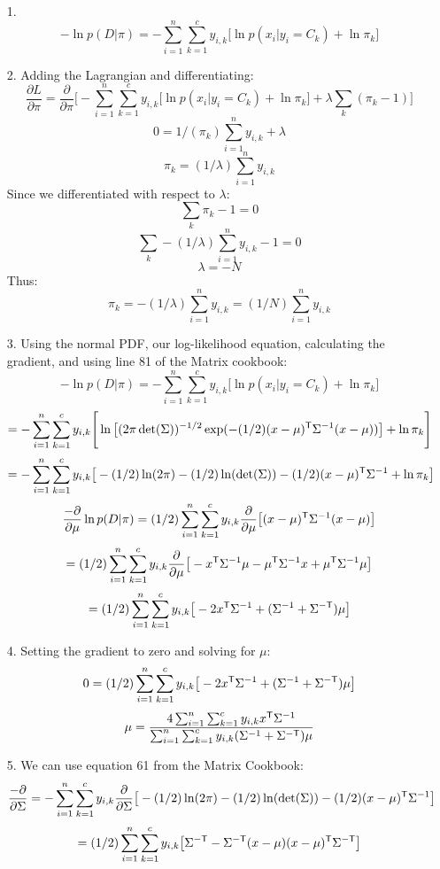 \documentclass[submit]{harvardml}
\begin{document}
\begin{enumerate}
\item[1.]
    $$-\ln p(D|\pi) = -\sum_{i=1}^n \sum_{k=1}^c y_{i,k}\big[\ln p(x_i|y_i=C_k) +
    \ln \pi_k \big]$$

\item[2.]
    Adding the Lagrangian and differentiating:
    $$\frac{\partial L}{\partial \pi} = \frac{\partial}{\partial
    \pi}\Bigg[-\sum_{i=1}^n \sum_{k=1}^c y_{i,k}\big[\ln p(x_i|y_i=C_k) + \ln
    \pi_k \big] + \lambda \sum_{k}(\pi_k - 1)\Bigg]$$
    $$0 = 1/(\pi_k)\sum_{i=1}^{n} y_{i,k} + \lambda$$
    $$\pi_k = (1/\lambda) \sum_{i=1}^{n} y_{i,k}$$
    Since we differentiated with respect to $\lambda$:
    $$\sum_k \pi_k - 1 = 0$$
    $$\sum_k - (1/\lambda) \sum_{i=1}^{n} y_{i,k} - 1 = 0$$
    $$\lambda = -N$$
    Thus:
    $$\pi_k = -(1/\lambda) \sum_{i=1}^{n} y_{i,k} = (1/N) \sum_{i=1}^{n}
    y_{i,k} $$

\item[3.]
    Using the normal PDF, our log-likelihood equation, calculating the
    gradient, and using line 81 of the Matrix cookbook:
    $$-\ln p(D|\pi) = -\sum_{i=1}^{n}\sum_{k=1}^{c}y_{i,k}\big[\ln p(x_i|y_i =
    C_k) + \ln \pi_k \big] $$
    $$= -\sum_{i=1}^{n}\sum_{k=1}^{c}y_{i,k}\Bigg[\ln \big[(2\pi
    \det(\Sigma))^{-1/2}\exp(-(1/2)(x-\mu)^{\mathsf{T}}\Sigma^{-1}(x-\mu)) \big] +
    \ln \pi_k \Bigg] $$
    $$= -\sum_{i=1}^{n}\sum_{k=1}^{c}y_{i,k}\big[-(1/2)\ln(2\pi) -
    (1/2)\ln(\det(\Sigma))-(1/2)(x-\mu)^{\mathsf{T}}\Sigma^{-1} + \ln \pi_k \big]
    $$
    $$\frac{-\partial}{\partial \mu} \ln p(D|\pi) = (1/2)\sum_{i=1}^{n}
    \sum_{k=1}^{c} y_{i,k}\frac{\partial}{\partial \mu}
    \big[(x-\mu)^{\mathsf{T}}\Sigma^{-1}(x-\mu) \big] $$
    $$= (1/2)\sum_{i=1}^{n}
    \sum_{k=1}^{c} y_{i,k}\frac{\partial}{\partial \mu}
    \big[-x^{\mathsf{T}}\Sigma^{-1}\mu-\mu^{\mathsf{T}}\Sigma^{-1}x +
    \mu^{\mathsf{T}}\Sigma^{-1}\mu \big] $$
    $$= (1/2)\sum_{i=1}^{n}
    \sum_{k=1}^{c} y_{i,k}
    \big[-2x^{\mathsf{T}}\Sigma^{-1} + (\Sigma^{-1} + \Sigma^{-\mathsf{T}})\mu \big] $$

\item[4.]
    Setting the gradient to zero and solving for $\mu$:
    $$0 = (1/2)\sum_{i=1}^{n}
    \sum_{k=1}^{c} y_{i,k}
    \big[-2x^{\mathsf{T}}\Sigma^{-1} + (\Sigma^{-1} + \Sigma^{-\mathsf{T}})\mu \big] $$
    $$\mu = \frac{4 \sum_{i=1}^{n} \sum_{k=1}^{c} y_{i,k}x^{\mathsf{T}}\Sigma^{-1}}
    {\sum_{i=1}^{n} \sum_{k=1}^{c} y_{i,k}(\Sigma^{-1} + \Sigma^{-\mathsf{T}})\mu} $$

\item[5.]
    We can use equation 61 from the Matrix Cookbook:
    $$\frac{-\partial}{\partial \Sigma} = -\sum_{i=1}^{n}\sum_{k=1}^{c}y_{i,k}
    \frac{\partial}{\partial \Sigma} \big[-(1/2)\ln(2\pi) -
    (1/2)\ln(\det(\Sigma))-(1/2)(x-\mu)^{\mathsf{T}}\Sigma^{-1} \big]
    $$
    $$=(1/2)\sum_{i=1}^{n}\sum_{k=1}^{c}y_{i,k}
    \big[\Sigma^{-\mathsf{T}}-\Sigma^{-\mathsf{T}}(x-\mu)(x-\mu)^{\mathsf{T}}\Sigma^{-\mathsf{T}}
    \big] $$

\end{enumerate}
\end{document}

